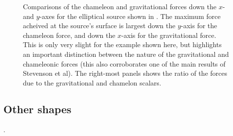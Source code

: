\documentclass[a4paper, 12pt]{article}
\numberwithin{equation}{section}
\begin{document}
\begin{figure}[!t]
      \begin{center}
      \end{center}
\caption{  Comparisons of the chameleon and gravitational forces down the $x$- and $y$-axes for the elliptical source shown in . The maximum force acheived at the source's surface is largest down the $y$-axis for the chameleon force, and down the $x$-axis for the gravitational force. This is only very slight for the example shown here, but highlights an important distinction between the nature of the gravitational and chameleonic forces (this also corroborates one of the main results of Stevenson et al). The right-most panels  shows the ratio of the forces due to the gravitational and chamelon scalars. }\label{fig:el-1dplots}
\end{figure}

\subsection{Other shapes}
.
\end{document}
